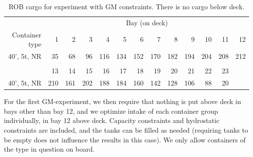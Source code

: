 \begin{table}[htbp]
\begin{small}
\begin{center}
\begin{tabular}{r|*{12}{r}}
&\multicolumn{12}{c}{Bay (on deck)}\\
Container type&1&2&3&4&5&6&7&8&9&10&11&12\\
\hline
40', 5t, NR & 35&68&96&116&134&152&170&182&194&204&208&212\\
\multicolumn{5}{c}{}\\
&13&14&15&16&17&18&19&20&21&22&23\\
\hline
40', 5t, NR &210&161&202&188&184&160&142&128&106&88&20\\
\end{tabular}
\end{center}
\end{small}
\caption{ROB cargo for experiment with GM constraints. There is no cargo below deck.}\label{tab:ROBGM}
\end{table}

For the first GM-experiment, we then require that nothing is put above deck in bays other than bay 12, and we optimize intake of each container group individually, in bay 12 above deck. Capacity constraints and hydrostatic constraints are included, and the tanks can be filled as needed (requiring tanks to be empty does not influence the results in this case). We only allow containers of the type in question on board. %


